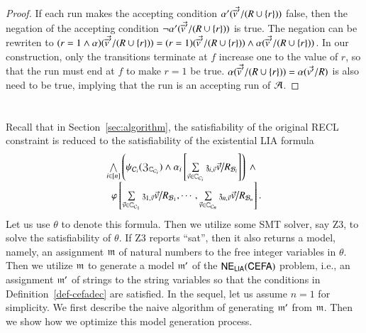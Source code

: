 {\begin{proof}
 If each run makes the accepting condition $\alpha'(\vec{\overline{v}'}/(R\cup\{r\}))$ false, then the negation of the accepting condition $\neg\alpha'(\vec{\overline{v}'}/(R\cup\{r\}))$ is true. The negation can be rewriten to $(r=1\wedge \alpha)(\vec{\overline{v}'}/(R\cup\{r\})) = (r=1)(\vec{\overline{v}'}/(R\cup\{r\}))\wedge \alpha(\vec{\overline{v}'}/(R\cup\{r\}))$. In our construction, only the transitions terminate at $f$ increase one to the value of $r$, so that the run must end at $f$ to make $r=1$ be true. $\alpha(\vec{\overline{v}'}/(R\cup\{r\})) = \alpha(\vec{v'}/R)$ is also need to be true, implying that the run is an accepting run of $\mathcal{A}$.
\end{proof}
}

\section{}\label{sec-opt-sol-gen}


Recall that in Section~\ref{sec:algorithm}, the satisfiability of the original RECL constraint is reduced to the satisfiability of the existential LIA formula
\[
\begin{array}{l}
\bigwedge \limits_{i \in [n]} \left(\psi_{\cC_i}(\fZ_{\costset_{\cC_i}}) \wedge \alpha_i\left[\sum\limits_{\myvec{v} \in \costset_{\cC_i}} \anivarz_{i, \myvec{v}} \myvec{v} \big{/}R_{\cB_i}  \right] \right) \ \wedge \\
\ \ \varphi \left[ \sum\limits_{\myvec{v} \in \costset_{\cC_1}} \anivarz_{1, \myvec{v}} \myvec{v} \big{/}R_{\cB_1}, \cdots, \sum\limits_{\myvec{v} \in \costset_{\cC_n}} \anivarz_{n, \myvec{v}} \myvec{v} \big{/}R_{\cB_n} \right].
\end{array}
\]
Let us use $\theta$ to denote this formula. 
Then we utilize some SMT solver, say Z3, to solve the satisfiability of $\theta$. If Z3 reports ``sat'', then it also returns a model, namely, an assignment $\mathfrak{m}$ of natural numbers to the free integer variables in $\theta$. Then we utilize $\mathfrak{m}$ to generate a model $\mathfrak{m}'$ of the ${\sf NE_{LIA}(CEFA)}$ problem, i.e., an assignment $\mathfrak{m}'$ of strings to the string variables so that the conditions in Definition~\ref{def-cefadec} are satisfied. 
In the sequel, let us assume $n=1$ for simplicity.
We first describe the naive algorithm of generating $\mathfrak{m}'$ from $\mathfrak{m}$. Then we show how we optimize this model generation process. 

